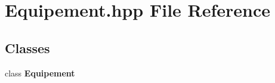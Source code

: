 \section{Equipement.\-hpp File Reference}
\label{_equipement_8hpp}
\subsection*{Classes}
\begin{DoxyCompactItemize}
\item 
class {\bf Equipement}
\end{DoxyCompactItemize}
